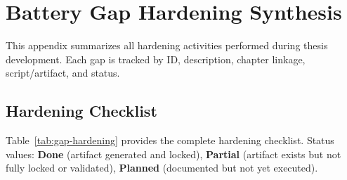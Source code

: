 \chapter{Battery Gap Hardening Synthesis}
\label{app:battery-gap-hardening}

This appendix summarizes all hardening activities performed during thesis development. Each gap is tracked by ID, description, chapter linkage, script/artifact, and status.

\section{Hardening Checklist}

Table~\ref{tab:gap-hardening} provides the complete hardening checklist. Status values: \textbf{Done} (artifact generated and locked), \textbf{Partial} (artifact exists but not fully locked or validated), \textbf{Planned} (documented but not yet executed).


